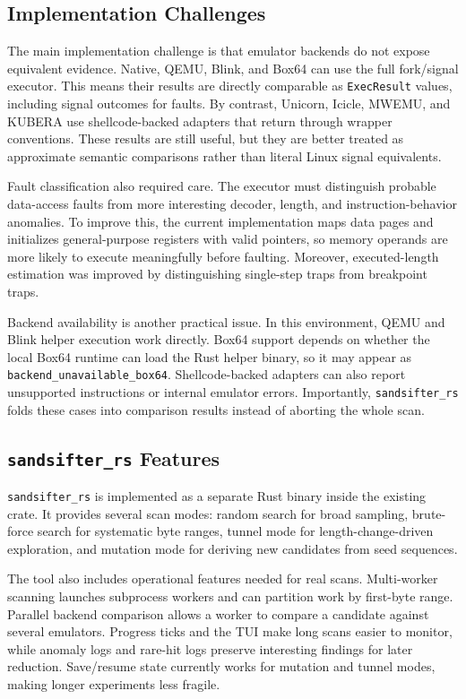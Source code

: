 
\subsection{Implementation Challenges}

The main implementation challenge is that emulator backends do not expose equivalent evidence. Native, QEMU, Blink, and Box64 can use the full fork/signal executor. This means their results are directly comparable as \texttt{ExecResult} values, including signal outcomes for faults. By contrast, Unicorn, Icicle, MWEMU, and KUBERA use shellcode-backed adapters that return through wrapper conventions. These results are still useful, but they are better treated as approximate semantic comparisons rather than literal Linux signal equivalents.

Fault classification also required care. The executor must distinguish probable data-access faults from more interesting decoder, length, and instruction-behavior anomalies. To improve this, the current implementation maps data pages and initializes general-purpose registers with valid pointers, so memory operands are more likely to execute meaningfully before faulting. Moreover, executed-length estimation was improved by distinguishing single-step traps from breakpoint traps.

Backend availability is another practical issue. In this environment, QEMU and Blink helper execution work directly. Box64 support depends on whether the local Box64 runtime can load the Rust helper binary, so it may appear as \texttt{backend\_unavailable\_box64}. Shellcode-backed adapters can also report unsupported instructions or internal emulator errors. Importantly, \texttt{sandsifter\_rs} folds these cases into comparison results instead of aborting the whole scan.

\subsection{\texttt{sandsifter\_rs} Features}

\texttt{sandsifter\_rs} is implemented as a separate Rust binary inside the existing crate. It provides several scan modes: random search for broad sampling, brute-force search for systematic byte ranges, tunnel mode for length-change-driven exploration, and mutation mode for deriving new candidates from seed sequences.

The tool also includes operational features needed for real scans. Multi-worker scanning launches subprocess workers and can partition work by first-byte range. Parallel backend comparison allows a worker to compare a candidate against several emulators. Progress ticks and the TUI make long scans easier to monitor, while anomaly logs and rare-hit logs preserve interesting findings for later reduction. Save/resume state currently works for mutation and tunnel modes, making longer experiments less fragile.

